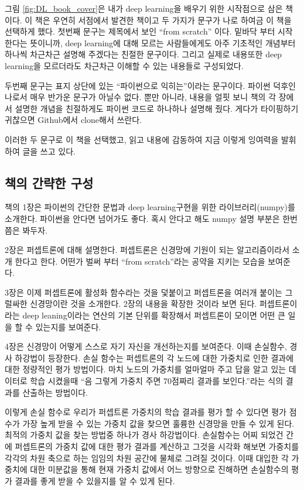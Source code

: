 	그림 \ref{fig:DL_book_cover}은 내가 deep learning을 배우기 위한 시작점으로 삼은 책이다. 이 책은 우연히 서점에서 발견한 책이고 두 가지가 문구가 나로 하여금 이 책을 선택하게 했다. 첫번째 문구는 제목에서 보인 ``from scratch'' 이다. 밑바닥 부터 시작한다는 뜻이니까, deep learning에 대해 모르는 사람들에게도 아주 기초적인 개념부터 하나씩 차근차근 설명해 주겠다는 친절한 문구이다. 그리고 실제로 내용또한 deep learning을 모르더라도 차근차근 이해할 수 있는 내용들로 구성되었다.
	
	두번째 문구는 표지 상단에 있는 ``파이썬으로 익히는''이라는 문구이다. 파이썬 덕후인 나로서 매우 반가운 문구가 아닐수 없다. 뿐만 아니라, 내용을 얼핏 보니 책의 각 장에서 설명한 개념을 친절하게도 파이썬 코드로 하나하나 설명해 줬다. 게다가 타이핑하기 귀찮으면 Github에서 clone해서 쓰란다.
	
	이러한 두 문구로 이 책을 선택했고, 읽고 내용에 감동하여 지금 이렇게 잉여력을 발휘하여 글을 쓰고 있다.
	
	\subsection{책의 간략한 구성}
	책의 1장은 파이썬의 간단한 문법과 deep learning구현을 위한 라이브러리(numpy)를 소개한다. 파이썬을 안다면 넘어가도 좋다. 혹시 안다고 해도 numpy 설명 부분은 한번쯤은 봐두자.
	
	2장은 퍼셉트론에 대해 설명한다.  퍼셉트론은 신경망에 기원이 되는 알고리즘이라서 소개 한다고 한다. 어떤가 벌써 부터 ``from scratch''라는 공약을 지키는 모습을 보여준다.
	
	3장은 이제 퍼셉트론에 활성화 함수라는 것을 덫붙이고 퍼셉트론을 여러개 붙이는 그럴싸한 신경망이란 것을 소개한다. 2장의 내용을 확장한 것이라 보면 된다. 퍼셉트론이라는 deep leaning이라는 연산의 기본 단위를 확장해서 퍼셉트론이 모이면 어떤 큰 일을 할 수 있는지를 보여준다.
	
	4장은 신경망이 어떻게 스스로 자기 자신을 개선하는지를 보여준다. 이때 손실함수, 경사 하강법이 등장한다. 손실 함수는 퍼셉트론의 각 노드에 대한 가중치로 인한 결과에 대한 정량적인 평가 방법이다. 마치 노드의 가중치를 얼마얼마 주고 답을 알고 있는 데이터로 학습 시켰을때 ``음 그렇게 가중치 주면 70점짜리 결과를 보인다.''라는 식의 결과를 산출하는 방법이다. 
	
	이렇게 손실 함수로 우리가 퍼셉트론 가중치의 학습 결과를 평가 할 수 있다면 평가 점수가 가장 높게 받을 수 있는 가중치 값을 찾으면 훌륭한 신경망을 만들 수 있게 된다. 최적의 가중치 값을 찾는 방법중 하나가 경사 하강법이다. 손실함수는 어찌 되었건 간에 퍼셉트론의 가중치 값에 대한 평가 결과를 계산하고 그것을 시각화 해보면 가중치를 각각의 차원 축으로 하는 임임의 차원 공간에 물체로 그려질 것이다. 이때 대입한 각 가중치에 대한 미분값을 통해 현재 가중치 값에서 어느 방향으로 진해하면 손실함수의 평가 결과를 좋게 받을 수 있을지를 알 수 있게 된다.
	
